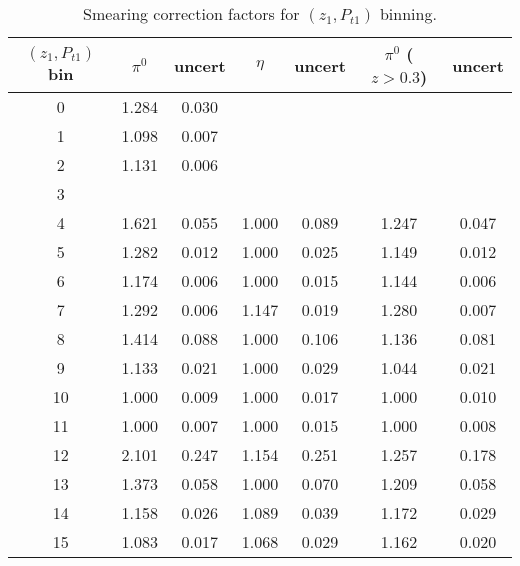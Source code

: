 \begin{table}[H]\footnotesize
\centering
\begin{tabular}{|c||c|c||c|c||c|c|}
\hline
$(z_{1},P_{t1})$ bin & $\pi^0$ &  uncert& $\eta$  &uncert  & $\pi^0$  ($z>0.3$) & uncert \\ \hline \hline
0	& 1.284 	& 0.030 	&	&	&	&	\\ \hline
1	& 1.098 	& 0.007 	& 	& 	& 	&	\\ \hline
2	& 1.131	& 0.006 	& 	& 	& 	& 	\\ \hline 
3	&		&		&	&	&	&	\\ \hline \hline
4	& 1.621	& 0.055	& 1.000 	& 0.089 	& 1.247 	& 0.047	\\ \hline
5	& 1.282	& 0.012 	& 1.000	& 0.025 	& 1.149	& 0.012 	\\ \hline
6	& 1.174	& 0.006 	& 1.000	& 0.015 	& 1.144	& 0.006 	\\ \hline
7	& 1.292	& 0.006 	& 1.147 	& 0.019 	& 1.280 	& 0.007 	\\ \hline \hline
8	& 1.414 	& 0.088 	& 1.000	& 0.106 	& 1.136 	& 0.081 	\\ \hline
9	& 1.133 	& 0.021 	& 1.000	& 0.029 	& 1.044 	& 0.021	\\ \hline
10	& 1.000 	& 0.009 	& 1.000	& 0.017 	& 1.000 	& 0.010	\\ \hline
11	& 1.000 	& 0.007 	& 1.000	& 0.015 	& 1.000 	& 0.008	\\ \hline \hline
12	& 2.101	& 0.247 	& 1.154	& 0.251 	& 1.257 	& 0.178	\\ \hline
13	& 1.373	& 0.058 	& 1.000	& 0.070 	& 1.209 	& 0.058	\\ \hline
14	& 1.158	& 0.026 	& 1.089	& 0.039 	& 1.172 	& 0.029	\\ \hline
15	& 1.083	& 0.017	& 1.068	& 0.029 	& 1.162 	& 0.020	\\ \hline
\end{tabular}
\caption{Smearing correction factors for $(z_1,P_{t1})$ binning.}
\label{tab:zpt_smearing_info}
\end{table}

